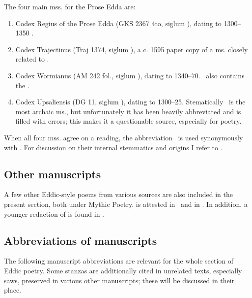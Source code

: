 The four main mss. for the Prose Edda are:%

\begin{enumerate}
  \item Codex Regius of the Prose Edda (GKS 2367 4to, siglum \RegiusProse), dating to 1300--1350 \ce.
  \item Codex Trajectinus (Traj 1374, siglum \Trajectinus), a c. 1595 paper copy of a ms. closely related to \RegiusProse.
  \item Codex Wormianus (AM 242 fol., siglum \Wormianus), dating to 1340--70. \Wormianus\ also contains the .
  \item Codex Upsaliensis (DG 11, siglum \Upsaliensis), dating to 1300--25.  Stematically \Upsaliensis\ is the most archaic ms., but unfortunately it has been heavily abbreviated and is filled with errors; this makes it a questionable source, especially for poetry.
\end{enumerate}

When all four mss. agree on a reading, the abbreviation \GylfMS\ is used synonymously with \RegiusProse\Trajectinus\Wormianus\Upsaliensis.  For discussion on their internal stemmatics and origins I refer to \textcite{Haukur2017}.

\subsection{Other manuscripts}

A few other Eddic-style poems from various sources are also included in the present section, both under Mythic Poetry.   is attested in \Wormianus\ and  in \FlatMS.  In addition, a younger redaction of  is found in \Hauksbok.

\subsection{Abbreviations of manuscripts}

The following manuscript abbreviations are relevant for the whole section of Eddic poetry.  Some stanzas are additionally cited in unrelated texts, especially saws, preserved in various other manuscripts; these will be discussed in their place.

